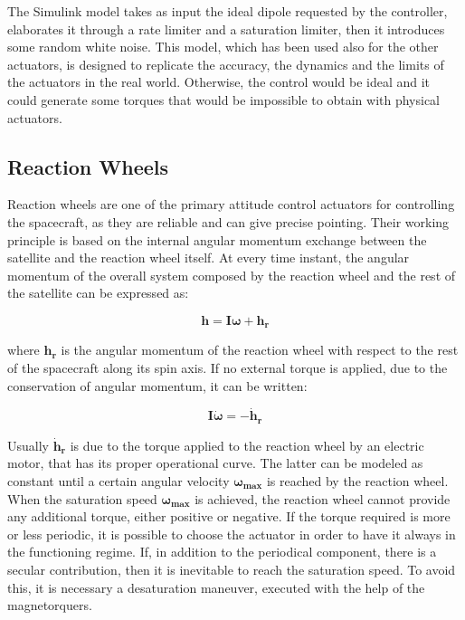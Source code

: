 The Simulink model takes as input the ideal dipole requested by the controller, elaborates it through a rate limiter and a saturation limiter, then it introduces some random white noise. This model, which has been used also for the other actuators, is designed to replicate the accuracy, the dynamics and the limits of the actuators in the real world. Otherwise, the control would be ideal and it could generate some torques that would be impossible to obtain with physical actuators.


\subsection{Reaction Wheels}
\label{subsec:reaction_wheels}

Reaction wheels are one of the primary attitude control actuators for controlling the spacecraft, as they are reliable and can give precise pointing. Their working principle is based on the internal angular momentum exchange between the satellite and the reaction wheel itself. At every time instant, the  angular momentum of the overall system composed by the reaction wheel and the rest of the satellite can be expressed as:

\begin{equation}
	\boldsymbol{h}=\boldsymbol{I}\boldsymbol{\omega}+\boldsymbol{h_r}
\end{equation}

where $\boldsymbol{h_r}$ is the angular momentum of the reaction wheel with respect to the rest of the spacecraft along its spin axis.
If no external torque is applied, due to the conservation of angular momentum, it can be written:

\begin{equation}
	\boldsymbol{I}\boldsymbol{\dot{\omega}}=-\boldsymbol{\dot{h}_r}
\end{equation}

Usually $\boldsymbol{\dot{h}_r}$ is due to the torque applied to the reaction wheel by an electric motor, that has its proper operational curve. The latter can be modeled as constant until a certain angular velocity $\boldsymbol{\omega_{max}}$ is reached by the reaction wheel. When the saturation speed $\boldsymbol{\omega_{max}}$ is achieved, the reaction wheel cannot provide any additional torque, either positive or negative. If the torque required is more or less periodic, it is possible to choose the actuator in order to have it always in the functioning regime. If, in addition to the periodical component, there is a secular contribution, then it is inevitable to reach the saturation speed. To avoid this, it is necessary a desaturation maneuver, executed with the help of the magnetorquers.


